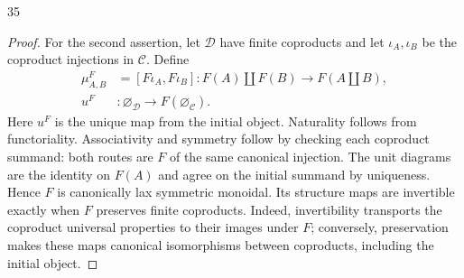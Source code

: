 \begin{exercise}{35}
\begin{proof}
For the second assertion, let $\mathcal D$ have finite
coproducts and let $\iota_A,\iota_B$ be the coproduct injections
in $\mathcal C$. Define
\[
 \begin{aligned}
  \mu^F_{A,B}&=[F\iota_A,F\iota_B]
   \colon F(A)\amalg F(B)\longrightarrow F(A\amalg B),\\
  u^F&\colon\varnothing_{\mathcal D}
                    \longrightarrow F(\varnothing_{\mathcal C}).
 \end{aligned}
\]
Here $u^F$ is the unique map from the initial object.
Naturality follows from functoriality. Associativity and
symmetry follow by checking each coproduct summand:
both routes are $F$ of the same
canonical injection. The unit diagrams are the identity
on $F(A)$ and agree on the initial summand by uniqueness.
Hence $F$ is canonically lax symmetric monoidal.
Its structure maps are invertible exactly when $F$ preserves
finite coproducts. Indeed, invertibility transports the
coproduct universal properties to their images under $F$;
conversely, preservation makes these maps canonical
isomorphisms between coproducts, including the initial object.
\end{proof}
\end{exercise}
